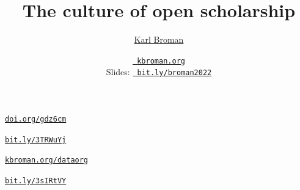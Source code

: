 \documentclass[aspectratio=169,12pt,t]{beamer}
\title{The culture of open scholarship}
\author{\href{https://kbroman.org}{Karl Broman}}
\institute{Biostatistics \& Medical Informatics \\ Univ.\ Wisconsin{\textendash}Madison}
\date{\href{https://kbroman.org}{\tt \scriptsize \color{foreground} kbroman.org}
\\[2pt]
\scriptsize {\lolit Slides:} \href{https://bit.ly/broman2022}{\tt \scriptsize
  \color{foreground} bit.ly/broman2022}
}
\begin{document}
{
 }



\begin{frame}[c]{}

  \vspace{24pt}


  \vfill
  \hfill
  \href{https://doi.org/gdz6cm}{\tt \footnotesize \lolit doi.org/gdz6cm}

\end{frame}


\begin{frame}[c]{}
\end{frame}


\begin{frame}[c]{}
\end{frame}


\begin{frame}[c]{}
  \vspace{8pt}


  \vfill
  \hfill
  \href{https://bit.ly/3TRWuYj}{\tt \footnotesize \lolit bit.ly/3TRWuYj}

\end{frame}


\begin{frame}[c]{}
  \vspace{8pt}


  \vfill
  \hfill
  \href{https://kbroman.org/dataorg}{\tt \footnotesize \lolit kbroman.org/dataorg}
\end{frame}


\begin{frame}[c]{}
  \vspace{8pt}


  \vfill
  \hfill
  \href{https://bit.ly/3sIRtVY}{\tt \footnotesize \lolit bit.ly/3sIRtVY}
\end{frame}
\end{document}
